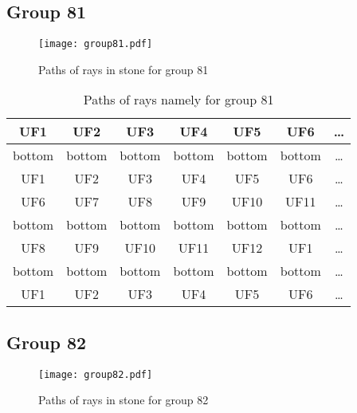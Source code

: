\subsection*{Group 81}






\begin{figure}[h!]
\centering
\texttt{[image: group81.pdf]}
\caption{Paths of rays in stone for group 81}
\label{table:FigGroup81}
\end{figure}



\begin{table}[h!]
\centering
\begin{tabular}{|c|c|c|c|c|c|c|}
\hline
UF1 & UF2 & UF3 & UF4 & UF5 & UF6 & \dots \\
\hline
bottom & bottom & bottom & bottom & bottom & bottom & \dots \\
\hline
UF1 & UF2 & UF3 & UF4 & UF5 & UF6 & \dots \\
\hline
UF6 & UF7 & UF8 & UF9 & UF10 & UF11 & \dots \\
\hline
bottom & bottom & bottom & bottom & bottom & bottom & \dots \\
\hline
UF8 & UF9 & UF10 & UF11 & UF12 & UF1 & \dots \\
\hline
bottom & bottom & bottom & bottom & bottom & bottom & \dots \\
\hline
UF1 & UF2 & UF3 & UF4 & UF5 & UF6 & \dots \\
\hline
\end{tabular}
\caption{Paths of rays namely for group 81}
\label{table:TableGroup81}
\end{table}
\newpage
\subsection*{Group 82}






\begin{figure}[h!]
\centering
\texttt{[image: group82.pdf]}
\caption{Paths of rays in stone for group 82}
\label{table:FigGroup82}
\end{figure}



